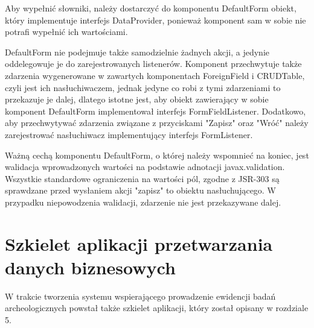 Aby wypełnić słowniki, należy dostarczyć do komponentu DefaultForm obiekt, który implementuje interfejs DataProvider, ponieważ komponent sam w sobie nie potrafi wypełnić ich wartościami.

DefaultForm nie podejmuje także samodzielnie żadnych akcji, a jedynie oddelegowuje je do zarejestrowanych listenerów. Komponent przechwytuje także zdarzenia wygenerowane w zawartych komponentach ForeignField i CRUDTable, czyli jest ich nasłuchiwaczem, jednak jedyne co robi z tymi zdarzeniami to przekazuje je dalej, dlatego istotne jest, aby obiekt zawierający w sobie komponent DefaultForm implementował interfejs FormFieldListener. Dodatkowo, aby przechwytywać zdarzenia związane z przyciskami "Zapisz" oraz "Wróć" należy zarejestrować nasłuchiwacz implementujący interfejs FormListener.

\newpage
Ważną cechą komponentu DefaultForm, o której należy wspomnieć na koniec, jest walidacja wprowadzonych wartości na podstawie adnotacji javax.validation. Wszystkie standardowe ograniczenia na wartości pól, zgodne z JSR-303 są sprawdzane przed wysłaniem akcji "zapisz" to obiektu nasłuchującego. W przypadku niepowodzenia walidacji, zdarzenie nie jest przekazywane dalej.
\section{Szkielet aplikacji przetwarzania danych biznesowych}
W trakcie tworzenia systemu wspierającego prowadzenie ewidencji badań archeologicznych powstał także szkielet aplikacji, który został opisany w rozdziale 5.


